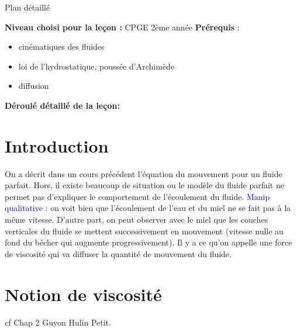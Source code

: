 \begin{reportBlock}{Plan détaillé}

  \textbf{Niveau choisi pour la leçon :} CPGE 2ème année
  \newline
  \textbf{Prérequis} : \begin{itemize}
  \item cinématiques des fluides
      \item loi de l'hydrostatique, poussée d'Archimède
      \item diffusion
      
  \end{itemize}

  \textbf{Déroulé détaillé de la leçon: }  
  
  \section*{Introduction}
  On a décrit dans un cours précédent l'équation du mouvement pour un fluide parfait. Hors, il existe beaucoup de situation ou le modèle du fluide parfait ne permet pas d'expliquer le comportement de l'écoulement du fluide. \textcolor{blue}{Manip qualitative :} on voit bien que l'écoulement de l'eau et du miel ne se fait pas à la même vitesse. D'autre part, on peut observer avec le miel que les couches verticales du fluide se mettent successivement en mouvement (vitesse nulle au fond du bécher qui augmente progressivement). Il y a ce qu'on appelle une force de viscosité qui va diffuser la quantité de mouvement du fluide.

  \section{Notion de viscosité}
cf Chap 2 Guyon Hulin Petit.

\end{reportBlock}
